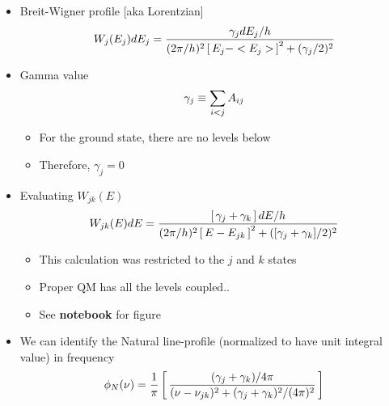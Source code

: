 \documentclass[12pt,letterpaper]{article}
\begin{document}
\begin{Aenumerate}
\begin{itemize}
\begin{itemize}
\begin{itemize}

		\item Breit-Wigner profile [aka Lorentzian]
		\begin{equation}
		W_j(E_j) dE_j = \frac{\gamma_j dE_j/h}{(2\pi/h)^2 \left [ \, E_j - 
		<E_j>\, \right ]^2 + (\gamma_j/2)^2}
		\end{equation}

		\item Gamma value
		\begin{equation}
		\gamma_j \equiv \sum\limits_{i<j} A_{ij}
		\end{equation}
			\begin{itemize}
			\item For the ground state, there are no levels below 
			\item Therefore, $\gamma_j = 0$
			\end{itemize}
		\item Evaluating $W_{jk}(E)$
		\begin{equation}
		W_{jk}(E) dE = \frac{\left [ \, \gamma_j + \gamma_k \, \right ] dE/h}{
		(2\pi/h)^2 \left [ \, E - E_{jk}\, \right ]^2 + ([\gamma_j + \gamma_k]/2)^2}
		\end{equation}
			\begin{itemize}
			\item This calculation was restricted to the $j$ and $k$ states
			\item Proper QM has all the levels coupled..
			\item See {\bf notebook} for figure
			\end{itemize}

		\item We can identify the Natural line-profile (normalized to have 
                    unit integral value) in frequency
		\begin{equation}
		\phi_N(\nu) = \frac{1}{\pi} 
                  \left [ \, \frac{(\gamma_j + \gamma_k)/4\pi}{(\nu - \nu_{jk})^2
		  + (\gamma_j + \gamma_k)^2 / (4\pi)^2} \, \right ]
		\end{equation}


\end{itemize}
\end{itemize}
\end{itemize}
\end{Aenumerate}
\end{document}
